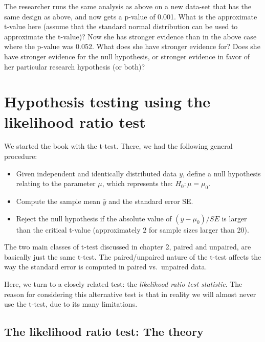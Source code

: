 \documentclass[
  12pt,
]{krantz}
\providecommand{\tightlist}{%
  \setlength{\itemsep}{0pt}\setlength{\parskip}{0pt}}
\theoremstyle{definition}
\theoremstyle{definition}
\theoremstyle{definition}
\theoremstyle{definition}
\theoremstyle{remark}
\begin{document}
The researcher runs the same analysis as above on a new data-set that has the same design as above, and now gets a p-value of 0.001. What is the approximate t-value here (assume that the standard normal distribution can be used to approximate the t-value)? Now she has stronger evidence than in the above case where the p-value was 0.052. What does she have stronger evidence for? Does she have stronger evidence for the null hypothesis, or stronger evidence in favor of her particular research hypothesis (or both)?

\hypertarget{hypothesis-testing-using-the-likelihood-ratio-test}{%
\chapter{Hypothesis testing using the likelihood ratio test}\label{hypothesis-testing-using-the-likelihood-ratio-test}}

We started the book with the t-test. There, we had the following general procedure:

\begin{itemize}
\tightlist
\item
  Given independent and identically distributed data \(y\), define a null hypothesis relating to the parameter \(\mu\), which represents the: \(H_0: \mu=\mu_0\).
\item
  Compute the sample mean \(\bar{y}\) and the standard error SE.
\item
  Reject the null hypothesis if the absolute value of \((\bar{y}-\mu_0)/SE\) is larger than the critical t-value (approximately \(2\) for sample sizes larger than 20).
\end{itemize}

The two main classes of t-test discussed in chapter 2, paired and unpaired, are basically just the same t-test. The paired/unpaired nature of the t-test affects the way the standard error is computed in paired vs.~unpaired data.

Here, we turn to a closely related test: the \emph{likelihood ratio test statistic}. The reason for considering this alternative test is that in reality we will almost never use the t-test, due to its many limitations.

\hypertarget{the-likelihood-ratio-test-the-theory}{%
\section{The likelihood ratio test: The theory}\label{the-likelihood-ratio-test-the-theory}}
\end{document}
